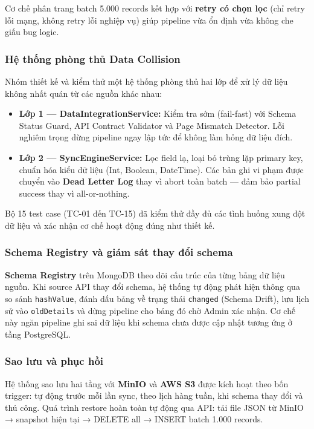 Cơ chế phân trang batch 5.000 records kết hợp với \textbf{retry có chọn lọc} (chỉ retry lỗi mạng, không retry lỗi nghiệp vụ) giúp pipeline vừa ổn định vừa không che giấu bug logic.

\subsubsection{Hệ thống phòng thủ Data Collision}

Nhóm thiết kế và kiểm thử một hệ thống phòng thủ hai lớp để xử lý dữ liệu không nhất quán từ các nguồn khác nhau:

\begin{itemize}
    \item \textbf{Lớp 1 — DataIntegrationService:} Kiểm tra sớm (fail-fast) với Schema Status Guard, API Contract Validator và Page Mismatch Detector. Lỗi nghiêm trọng dừng pipeline ngay lập tức để không làm hỏng dữ liệu đích.
    \item \textbf{Lớp 2 — SyncEngineService:} Lọc field lạ, loại bỏ trùng lặp primary key, chuẩn hóa kiểu dữ liệu (Int, Boolean, DateTime). Các bản ghi vi phạm được chuyển vào \textbf{Dead Letter Log} thay vì abort toàn batch — đảm bảo partial success thay vì all-or-nothing.
\end{itemize}

Bộ 15 test case (TC-01 đến TC-15) đã kiểm thử đầy đủ các tình huống xung đột dữ liệu và xác nhận cơ chế hoạt động đúng như thiết kế.

\subsubsection{Schema Registry và giám sát thay đổi schema}

\textbf{Schema Registry} trên MongoDB theo dõi cấu trúc của từng bảng dữ liệu nguồn. Khi source API thay đổi schema, hệ thống tự động phát hiện thông qua so sánh \texttt{hashValue}, đánh dấu bảng về trạng thái \texttt{changed} (Schema Drift), lưu lịch sử vào \texttt{oldDetails} và dừng pipeline cho bảng đó chờ Admin xác nhận. Cơ chế này ngăn pipeline ghi sai dữ liệu khi schema chưa được cập nhật tương ứng ở tầng PostgreSQL.

\subsubsection{Sao lưu và phục hồi}

Hệ thống sao lưu hai tầng với \textbf{MinIO} và \textbf{AWS S3} được kích hoạt theo bốn trigger: tự động trước mỗi lần sync, theo lịch hàng tuần, khi schema thay đổi và thủ công. Quá trình restore hoàn toàn tự động qua API: tải file JSON từ MinIO → snapshot hiện tại → DELETE all → INSERT batch 1.000 records.

